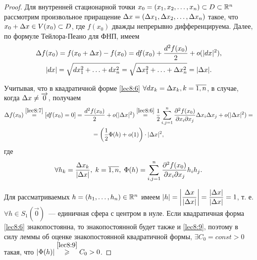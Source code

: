 \documentclass[../../main.tex]{subfiles}
\begin{document}
    \begin{proof}
        Для внутренней стационарной точки $x_0 = (x_1, x_2, \ldots, x_n)
        \subset D \subset \R^n$ рассмотрим произвольное приращение $\D x =
        (\D x_1, \D x_2, \ldots, \D x_n)$ такое, что $x_0 + \D x \in V(x_0)
        \subset D$, где $f(x_0)$ дважды непрерывно дифференцируема. Далее, по
        формуле Тейлора-Пеано для ФНП, имеем
        \begin{equation}
            \begin{gathered}
                \D f(x_0) = f(x_0 + \D x) - f(x_0) = df(x_0) +
                \frac{d^2f(x_0)}2 + o(|dx|^2), \\|dx| = \sqrt{dx_1^2 + \ldots
                + dx_n^2} = \sqrt{\D x_1^2 + \ldots + \D x_n^2} = |\D x|.
            \end{gathered}
            \label{lec8:7}
        \end{equation}

        Учитывая, что в квадратичной форме \eqref{lec8:6} $\forall dx_k = \D
        x_k, k = \overline{1, n}$, в случае, когда $\D x \ne
        \overrightarrow{0}$, получаем
        \begin{equation}
            \begin{gathered}
                \D f(x_0) \stackrel{\eqref{lec8:7}}{=} [df(x_0) = 0] =
                \frac{d^2f(x_0)}2 + o(|\D x|^2) \stackrel{\eqref{lec8:6}}{=}
                \frac12 \sum_{i, j = 1}^n\pderiv{^2f(x_0)}{x_i\partial x_j}\D
                x_i \D x_j+ o(|\D x|^2) = \\ =\left(\frac12 \Phi(h) +
                o(1)\right) \cdot |\D x|^2,
            \end{gathered}
            \label{lec8:8}
        \end{equation}
        где
        \begin{equation}
            \forall h_k = \frac{\D x_k}{|\D x|}, \; k = \overline{1,n}, \;
            \Phi(h) =
                \sum_{i, j = 1}^n\pderiv{^2f(x_0)}{x_i\partial x_j}h_ih_j.
        \label{lec8:9}
        \end{equation}

        Для рассматриваемых $h = (h_1, \ldots, h_n) \in \R^n$ имеем
        $|h| = \left|\dfrac{\D x}{|\D x|}\right| = \dfrac{|\D x|}{|\D x|} = 1$,
        т. е. $\forall h \in S_1(\overrightarrow{0})$~--- единичная сфера с
        центром в нуле. Если квадратичная форма \eqref{lec8:6} знакопостоянна,
        то знакопостоянной будет также и \eqref{lec8:9}, поэтому в силу леммы
        об оценке знакопостоянной квадратичной формы, $\exists C_0 = const >
        0$ такая, что $|\Phi(h)| \stackrel{\eqref{lec8:9}}{\geq} C_0 > 0$.


\end{proof}
\end{document}
